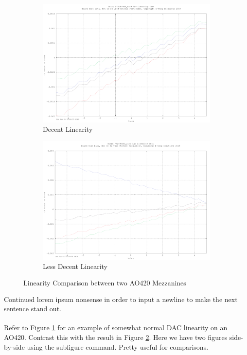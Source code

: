 \documentclass[]{article}
\begin{document}
\begin{figure}[h]
	\begin{subfigure}{0.5\textwidth}
		\includegraphics[width=0.9\linewidth]{images/F42000068_gain0_RAW_Linearity_Test}
		\caption{Decent Linearity}
		\label{fig:goodlin}
	\end{subfigure}
	\begin{subfigure}{0.5\textwidth}
		\includegraphics[width=0.9\linewidth]{images/F42000052_gain0_RAW_Linearity_Test}
		\caption{Less Decent Linearity}
		\label{fig:badlin}
	\end{subfigure}
	
	\caption{Linearity Comparison between two AO420 Mezzanines}
	\label{fig:complin}
\end{figure}

Continued lorem ipsum nonsense in order to input a newline to make the next sentence stand out.\\\\
Refer to Figure \ref{fig:goodlin} for an example of somewhat normal DAC linearity on an AO420.
Contrast this with the result in Figure \ref{fig:badlin}.
Here we have two figures side-by-side using the subfigure command. Pretty useful for comparisons.
\end{document}
